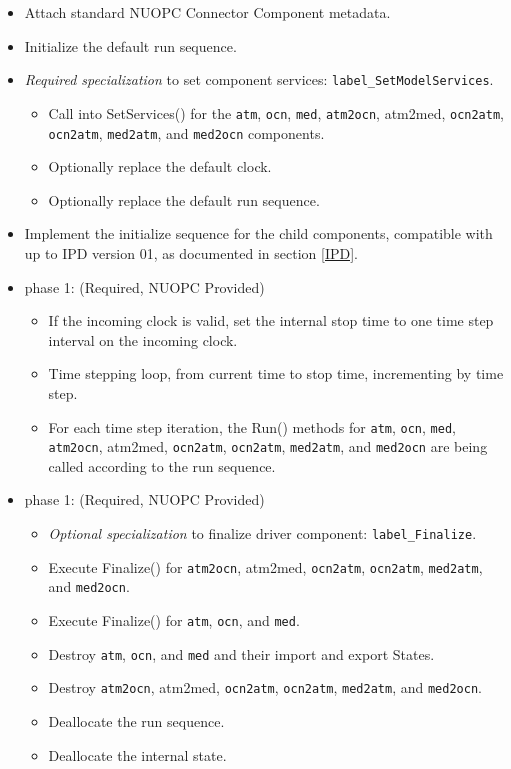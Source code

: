 \begin{itemize}
\begin{itemize}
  \item Attach standard NUOPC Connector Component metadata.
  \item Initialize the default run sequence.
  \item {\it Required specialization} to set component services: {\tt label\_SetModelServices}. 
  \begin{itemize}
    \item Call into SetServices() for the {\tt atm}, {\tt ocn}, {\tt med}, {\tt atm2ocn}, {atm2med}, {\tt ocn2atm}, {\tt ocn2atm}, {\tt med2atm}, and {\tt med2ocn} components.
    \item Optionally replace the default clock. 
    \item Optionally replace the default run sequence.
  \end{itemize}
  \item Implement the initialize sequence for the child components, compatible with up to IPD version 01, as documented in section \ref{IPD}.
  \end{itemize}  
\end{itemize}

\begin{itemize}
\item phase 1: ({\sc Required, NUOPC Provided})
  \begin{itemize}
  \item If the incoming clock is valid, set the internal stop time to one time step interval on the incoming clock.
  \item Time stepping loop, from current time to stop time, incrementing by time step.
  \item For each time step iteration, the Run() methods for {\tt atm}, {\tt ocn}, {\tt med}, {\tt atm2ocn}, {atm2med}, {\tt ocn2atm}, {\tt ocn2atm}, {\tt med2atm}, and {\tt med2ocn} are being called according to the run sequence.
  \end{itemize}    
\end{itemize}

\begin{itemize}
\item phase 1: ({\sc Required, NUOPC Provided})
  \begin{itemize}
  \item {\it Optional specialization} to finalize driver component: {\tt label\_Finalize}.
  \item Execute Finalize() for {\tt atm2ocn}, {atm2med}, {\tt ocn2atm}, {\tt ocn2atm}, {\tt med2atm}, and {\tt med2ocn}.
  \item Execute Finalize() for {\tt atm}, {\tt ocn}, and {\tt med}.
  \item Destroy {\tt atm}, {\tt ocn}, and {\tt med} and their import and export States.
  \item Destroy {\tt atm2ocn}, {atm2med}, {\tt ocn2atm}, {\tt ocn2atm}, {\tt med2atm}, and {\tt med2ocn}.
  \item Deallocate the run sequence.
  \item Deallocate the internal state.
  \end{itemize}      
\end{itemize}

